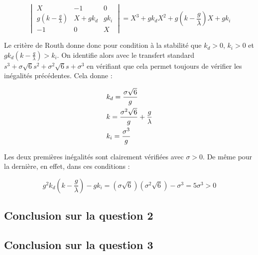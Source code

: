 \documentclass[10pt]{article}
\begin{document}
\[
	\begin{vmatrix}
		X & - 1 & 0 \\
		g ( k - \frac{g}{\lambda} ) & X + g k_d & g k_i \\
		- 1 & 0 & X
	\end{vmatrix}
	= X^3 + g k_d X^2 + g ( k - \frac{g}{\lambda} ) X + g k_i
\]

\vspace{10px}

\noindent Le critère de Routh donne donc pour condition à la stabilité que $k_d > 0$, $k_i > 0$ et
$g k_d ( k - \frac{g}{\lambda} )  > k_i$. On identifie alors avec le transfert standard
$s^3 + \sigma \sqrt 6 s^2 + \sigma^2 \sqrt 6 s + \sigma^3$ en vérifiant que cela permet toujours de vérifier les
inégalités précédentes. Cela donne :

\begin{align}
	&k_d = \frac{\sigma \sqrt 6}{g} \notag \\
	&k = \frac{\sigma^2 \sqrt 6}{g} + \frac{g}{\lambda} \notag \\
	&k_i = \frac{\sigma^3}{g} \notag
\end{align}

\noindent Les deux premières inégalités sont clairement vérifiées avec $\sigma > 0$. De même pour la dernière,
en effet, dans ces conditions :

\[
	g^2 k_d ( k - \frac{g}{\lambda} )  - g k_i = ( \sigma \sqrt 6 ) ( \sigma^2 \sqrt 6 ) - \sigma^3 = 5 \sigma^3 > 0
\]

\subsection*{Conclusion sur la question 2}


\subsection*{Conclusion sur la question 3}

\end{document}

